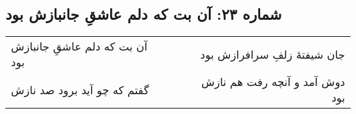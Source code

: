\begin{center}
\section*{شماره ۲۳: آن بت که دلم عاشقِ جانبازش بود}
\label{sec:023}
\begin{longtable}{l p{0.5cm} r}
آن بت که دلم عاشقِ جانبازش بود
&&
جان شیفتهٔ زلفِ سرافرازش بود
\\
گفتم که چو آید برود صد نازش
&&
دوش آمد و آنچه رفت هم نازش بود
\\
\end{longtable}
\end{center}
